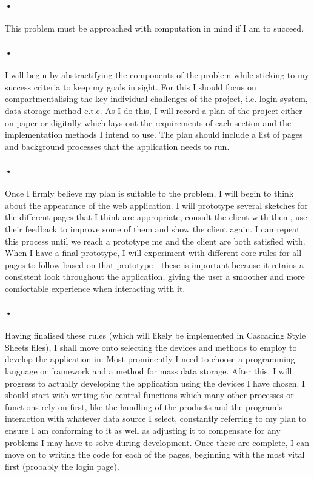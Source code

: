 ﻿\documentclass{article}
\begin{document}
    \paragraph{•}
    This problem must be approached with computation in mind if I am to succeed.
    \paragraph{•}
    I will begin by abstractifying the components of the problem while sticking to my success criteria to keep my goals in sight.
    For this I should focus on compartmentalising the key individual challenges of the project, i.e. login system, data storage method e.t.c.
    As I do this, I will record a plan of the project either on paper or digitally which lays out the requirements of each section and the implementation methods I intend to use.
    The plan should include a list of pages and background processes that the application needs to run.
    \paragraph{•}
    Once I firmly believe my plan is suitable to the problem, I will begin to think about the appearance of the web application.
    I will prototype several sketches for the different pages that I think are appropriate, consult the client with them, use their feedback to improve some of them and show the client again.
    I can repeat this process until we reach a prototype me and the client are both satisfied with.
    When I have a final prototype, I will experiment with different core rules for all pages to follow based on that prototype - these is important because it retains a consistent look throughout the application, giving the user a smoother and more comfortable experience when interacting with it.
    \paragraph{•}
    Having finalised these rules (which will likely be implemented in Cascading Style Sheets files), I shall move onto selecting the devices and methods to employ to develop the application in.
    Most prominently I need to choose a programming language or framework and a method for mass data storage.
    After this, I will progress to actually developing the application using the devices I have chosen.
    I should start with writing the central functions which many other processes or functions rely on first, like the handling of the products and the program's interaction with whatever data source I select, constantly referring to my plan to ensure I am conforming to it as well as adjusting it to compensate for any problems I may have to solve during development.
    Once these are complete, I can move on to writing the code for each of the pages, beginning with the most vital first (probably the login page).
\end{document}
